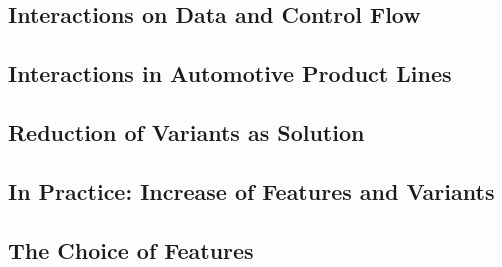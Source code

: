 \documentclass[
	aspectratio=169, %
	8pt, %
	handout, %
]{beamer}
\begin{document}
\subsection{Interactions on Data and Control Flow}
\subsection{Interactions in Automotive Product Lines}
\subsection{Reduction of Variants as Solution}
\subsection{In Practice: Increase of Features and Variants}
\subsection{The Choice of Features}

%		
\end{document}
